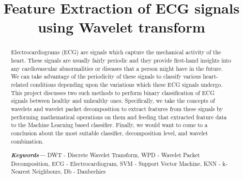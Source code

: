 \documentclass[10pt,twocolumn,letterpaper]{article}
\begin{document}
\title{Feature Extraction of ECG signals using Wavelet transform}

\maketitle

\begin{abstract}
Electrocardiograms (ECG) are signals which capture the mechanical activity of the heart. These signals are usually fairly periodic and they provide first-hand insights into any cardiovascular abnormalities or diseases that a person might have in the future. We can take advantage of the periodicity of these signals to classify various heart-related conditions depending upon the variations which these ECG signals undergo. This project discusses two such methods to perform binary classification of ECG signals between healthy and unhealthy ones. Specifically, we take the concepts of wavelets and wavelet packet decomposition to extract features from these signals by performing mathematical operations on them and feeding that extracted feature data to the Machine Learning based classifier. Finally, we would want to come to a conclusion about the most suitable classifier, decomposition level, and wavelet combination.\\
   \providecommand{\keywords}[1]
{
  \small	
  \textbf{\textit{Keywords---}} #1
}
\keywords{DWT - Discrete Wavelet Transform, WPD - Wavelet Packet Decomposition, ECG - Electrocardiogram, SVM - Support Vector Machine, KNN - k-Nearest Neighbours, Db - Daubechies}
\end{abstract}

\end{document}
